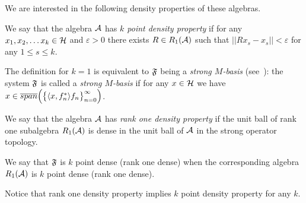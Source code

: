 \documentclass[12pt]{amsart}
\theoremstyle{case}
\begin{document}
    We are interested in the following density properties of these algebras.
    \begin{definition}
      \label{kpd}
      We say that the algebra $\cal{A}$ has \emph{$k$ point density property} if for any $x_1, x_2,\dots x_k \in \cal{H}$ and $\varepsilon > 0$
        there exists $R\in R_1(\cal{A})$ such that $||Rx_s - x_s|| < \varepsilon$ for any $1 \leq s \leq k$.
    \end{definition}
    The definition for $k=1$ is equivalent to $\fsys$ being a \emph{strong $M$-basis} (see~\cite{katavolos}):
      the system $\fsys$ is called a \emph{strong $M$-basis} if for any $x\in\cal{H}$ we have $x \in \overline{span}\Big(\big\{\inner{x}{f^*_n}f_n\big\}_{n=0}^\infty\Big)$.
    \begin{definition}
      \label{r1d}
      We say that the algebra $\cal{A}$ has \emph{rank one density property} if the unit ball of rank one subalgebra $R_1(\cal{A})$
        is dense in the unit ball of $\cal{A}$ in the strong operator topology.
    \end{definition}
    We say that $\fsys$ is $k$ point dense (rank one dense) when
      the corresponding algebra $R_1(\cal{A})$ is $k$ point dense (rank one dense).

    Notice that rank one density property implies $k$ point density property for any $k$.

\end{document}
